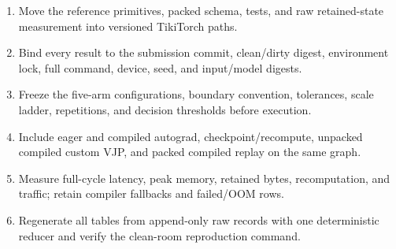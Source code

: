 \begin{enumerate}[leftmargin=1.5em]
  \item Move the reference primitives, packed schema, tests, and raw
  retained-state measurement into versioned TikiTorch paths.
  \item Bind every result to the submission commit, clean/dirty digest,
  environment lock, full command, device, seed, and input/model digests.
  \item Freeze the five-arm configurations, boundary convention, tolerances,
  scale ladder, repetitions, and decision thresholds before execution.
  \item Include eager and compiled autograd, checkpoint/recompute, unpacked
  compiled custom VJP, and packed compiled replay on the same graph.
  \item Measure full-cycle latency, peak memory, retained bytes, recomputation,
  and traffic; retain compiler fallbacks and failed/OOM rows.
  \item Regenerate all tables from append-only raw records with one
  deterministic reducer and verify the clean-room reproduction command.
\end{enumerate}
